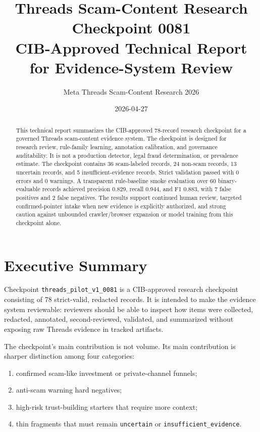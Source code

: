 \documentclass[11pt]{article}
\title{Threads Scam-Content Research Checkpoint 0081\\
\large CIB-Approved Technical Report for Evidence-System Review}
\author{Meta Threads Scam-Content Research 2026}
\date{2026-04-27}
\newcommand{\checkpoint}{\texttt{threads\_pilot\_v1\_0081}}
\begin{document}
\maketitle

\begin{abstract}
This technical report summarizes the CIB-approved 78-record research checkpoint for a governed Threads scam-content evidence system.
The checkpoint is designed for research review, rule-family learning, annotation calibration, and governance auditability.
It is not a production detector, legal fraud determination, or prevalence estimate.
The checkpoint contains 36 scam-labeled records, 24 non-scam records, 13 uncertain records, and 5 insufficient-evidence records.
Strict validation passed with 0 errors and 0 warnings.
A transparent rule-baseline smoke evaluation over 60 binary-evaluable records achieved precision 0.829, recall 0.944, and F1 0.883, with 7 false positives and 2 false negatives.
The results support continued human review, targeted confirmed-pointer intake when new evidence is explicitly authorized, and strong caution against unbounded crawler/browser expansion or model training from this checkpoint alone.
\end{abstract}

\section*{Executive Summary}

Checkpoint \checkpoint{} is a CIB-approved research checkpoint consisting of 78 strict-valid, redacted records.
It is intended to make the evidence system reviewable: reviewers should be able to inspect how items were collected, redacted, annotated, second-reviewed, validated, and summarized without exposing raw Threads evidence in tracked artifacts.

The checkpoint's main contribution is not volume.
Its main contribution is sharper distinction among four categories:

\begin{enumerate}[leftmargin=*]
  \item confirmed scam-like investment or private-channel funnels;
  \item anti-scam warning hard negatives;
  \item high-risk trust-building starters that require more context;
  \item thin fragments that must remain \texttt{uncertain} or \texttt{insufficient\_evidence}.
\end{enumerate}
\end{document}
